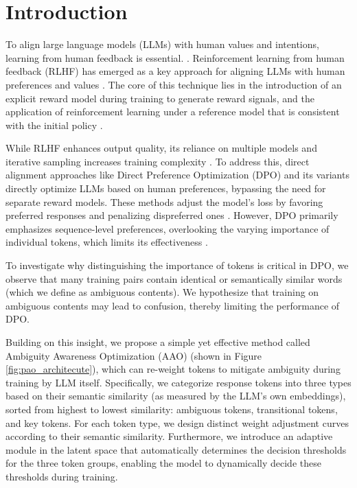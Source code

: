\section{Introduction}
\label{sec:intro}
To align large language models (LLMs) with human values and intentions, learning from human feedback is essential. \cite{ziegler2019fine,stiennon2020learning,bai2022training}. Reinforcement learning from human feedback (RLHF) has emerged as a key approach for aligning LLMs with human preferences and values \cite{christiano2017deep,ouyang2022training}. The core of this technique lies in the introduction of an explicit reward model during training to generate reward signals, and the application of reinforcement learning under a reference model that is consistent with the initial policy \cite{achiam2023gpt,touvron2023llama}. 

While RLHF enhances output quality, its reliance on multiple models and iterative sampling increases training complexity \cite{zhao2023slic,yuan2023rrhf,azar2024general,hong2024orpo,casper2023open}. To address this, direct alignment approaches like Direct Preference Optimization (DPO) \cite{rafailov2023direct} and its variants \cite{zhao2023slic,yuan2023rrhf,hong2024orpo,ethayarajh2024model,park2024disentangling,xu2024contrastive,ethayarajh2024kto,tang2024generalized,meng2024simpo} directly optimize LLMs based on human preferences, bypassing the need for separate reward models. These methods adjust the model’s loss by favoring preferred responses and penalizing dispreferred ones \cite{zhao2024rainbowpo,zeng2024token,liao2024tpo,liu2024tis}. However, DPO primarily emphasizes sequence-level preferences, overlooking the varying importance of individual tokens, which limits its effectiveness \cite{lin2024rho,zeng2024token,liu2024tis,gu2025mask}.

To investigate why distinguishing the importance of tokens is critical in DPO, we observe that many training pairs contain identical or semantically similar words (which we define as ambiguous contents). We hypothesize that training on ambiguous contents may lead to confusion, thereby limiting the performance of DPO. 

Building on this insight, we propose a simple yet effective method called Ambiguity Awareness Optimization (AAO) (shown in Figure \ref{fig:pao_architecute}), which can re-weight tokens to mitigate ambiguity during training by LLM itself. Specifically, we categorize response tokens into three types based on their semantic similarity (as measured by the LLM’s own embeddings), sorted from highest to lowest similarity: ambiguous tokens, transitional tokens, and key tokens. For each token type, we design distinct weight adjustment curves according to their semantic similarity. Furthermore, we introduce an adaptive module in the latent space that automatically determines the decision thresholds for the three token groups, enabling the model to dynamically decide these thresholds during training.

